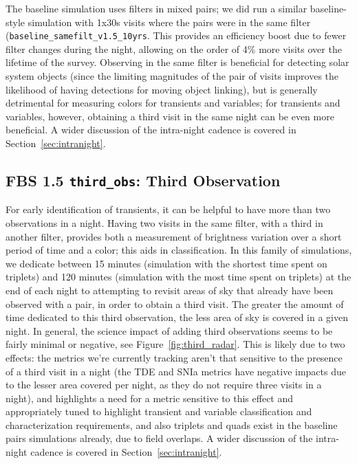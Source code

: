 The baseline simulation uses filters in mixed pairs; we did run a similar baseline-style simulation with 1x30s visits where the pairs were in the same filter ({\tt baseline\_samefilt\_v1.5\_10yrs}. This provides an efficiency boost due to fewer filter changes during the night, allowing on the order of 4\% more visits over the lifetime of the survey. Observing in the same filter is beneficial for detecting solar system objects (since the limiting magnitudes of the pair of visits improves the likelihood of having detections for moving object linking), but is generally detrimental for measuring colors for transients and variables; for transients and variables, however, obtaining a third visit in the same night can be even more beneficial. A wider discussion of the intra-night cadence is covered in Section~\ref{sec:intranight}.

\subsection{FBS 1.5 {\tt third\_obs}: Third Observation}\label{ss:thirdobs}

For early identification of transients, it can be helpful to have more than two observations in a night. Having two visits in the same filter, with a third in another filter, provides both a measurement of brightness variation over a short period of time and a color; this aids in classification. In this family of simulations, we dedicate between 15 minutes (simulation with the shortest time spent on triplets) and 120 minutes  (simulation with the most time spent on triplets) at the end of each night to attempting to revisit areas of sky that already have been observed with a pair, in order to obtain a third visit. The greater the amount of time dedicated to this third observation, the less area of sky is covered in a given night. In general, the science impact of adding third observations seems to be fairly minimal or negative, see Figure~\ref{fig:third_radar}. This is likely due to two effects: the metrics we're currently tracking aren't that sensitive to the presence of a third visit in a night (the TDE and SNIa metrics have negative impacts due to the lesser area covered per night, as they do not require three visits in a night), and highlights a need for a metric sensitive to this effect and appropriately tuned to highlight transient and variable classification and characterization requirements, and also triplets and quads exist in the baseline pairs simulations already, due to field overlaps. A wider discussion of the intra-night cadence is covered in Section~\ref{sec:intranight}.


